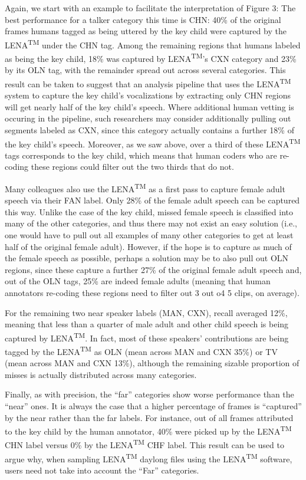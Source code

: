 \documentclass[english,table,man,floatsintext]{apa6}
\begin{document}
Again, we start with an example to facilitate the interpretation of Figure 3: The best performance for a talker category this time is CHN: 40\% of the original frames humans tagged as being uttered by the key child were captured by the LENA\textsuperscript{TM} under the CHN tag. Among the remaining regions that humans labeled as being the key child, 18\% was captured by LENA\textsuperscript{TM}'s CXN category and 23\% by its OLN tag, with the remainder spread out across several categories. This result can be taken to suggest that an analysis pipeline that uses the LENA\textsuperscript{TM} system to capture the key child's vocalizations by extracting only CHN regions will get nearly half of the key child's speech. Where additional human vetting is occuring in the pipeline, such researchers may consider additionally pulling out segments labeled as CXN, since this category actually contains a further 18\% of the key child's speech. Moreover, as we saw above, over a third of these LENA\textsuperscript{TM} tags corresponds to the key child, which means that human coders who are re-coding these regions could filter out the two thirds that do not.

Many colleagues also use the LENA\textsuperscript{TM} as a first pass to capture female adult speech via their FAN label. Only 28\% of the female adult speech can be captured this way. Unlike the case of the key child, missed female speech is classified into many of the other categories, and thus there may not exist an easy solution (i.e., one would have to pull out all examples of many other categories to get at least half of the original female adult). However, if the hope is to capture as much of the female speech as possible, perhaps a solution may be to also pull out OLN regions, since these capture a further 27\% of the original female adult speech and, out of the OLN tags, 25\% are indeed female adults (meaning that human annotators re-coding these regions need to filter out 3 out o4 5 clips, on average).

For the remaining two near speaker labels (MAN, CXN), recall averaged 12\%, meaning that less than a quarter of male adult and other child speech is being captured by LENA\textsuperscript{TM}. In fact, most of these speakers' contributions are being tagged by the LENA\textsuperscript{TM} as OLN (mean across MAN and CXN 35\%) or TV (mean across MAN and CXN 13\%), although the remaining sizable proportion of misses is actually distributed across many categories.

Finally, as with precision, the \enquote{far} categories show worse performance than the \enquote{near} ones. It is always the case that a higher percentage of frames is \enquote{captured} by the near rather than the far labels. For instance, out of all frames attributed to the key child by the human annotator, 40\% were picked up by the LENA\textsuperscript{TM} CHN label versus 0\% by the LENA\textsuperscript{TM} CHF label. This result can be used to argue why, when sampling LENA\textsuperscript{TM} daylong files using the LENA\textsuperscript{TM} software, users need not take into account the \enquote{Far} categories.
\end{document}
